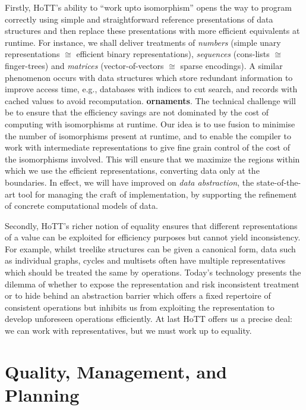\documentclass[a4paper,11pt]{article}
\begin{document}
Firstly, HoTT's ability to ``work upto isomorphism'' opens the way to
program correctly using simple and straightforward reference
presentations of data structures and then replace these presentations
with more efficient equivalents at runtime. For instance, we shall
deliver treatments of \emph{numbers} (simple unary representations $\cong$
efficient binary representations), \emph{sequences} (cons-lists $\cong$
finger-trees) and \emph{matrices} (vector-of-vectors $\cong$ sparse
encodings). %
A similar phenomenon occurs with data structures which store redundant
information to improve access time, e.g., databases with indices to
cut search, and records with cached values to avoid
recomputation. {\bf ornaments}. The technical challenge will be to
ensure that the efficiency savings are not dominated by the cost of
computing with isomorphisms at runtime. Our idea is to use fusion to
minimise the number of isomorphisms present at runtime, and to enable
the compiler to work with intermediate representations to give fine
grain control of the cost of the isomorphisms involved.  This will
ensure that we maximize the regions within which we use the efficient
representations, converting data only at the boundaries.  In effect,
we will have improved on \emph{data abstraction}, the state-of-the-art
tool for managing the craft of implementation, by supporting the
refinement of concrete computational models of data.

Secondly, HoTT's richer notion of equality ensures that different
representations of a value can be exploited for efficiency purposes
but cannot yield inconsistency. For example, whilst treelike
structures can be given a canonical form, data such as individual graphs, cycles
and multisets often have multiple representatives which should be
treated the same by operations. Today's technology presents the
dilemma of whether to expose the representation and risk inconsistent
treatment or to hide behind an abstraction barrier which offers a
fixed repertoire of consistent operations but inhibits us from
exploiting the representation to develop unforeseen operations
efficiently. At last HoTT offers us a precise deal: we can work with
representatives, but we must work up to equality. 


\section{Quality, Management, and Planning}
\end{document}
